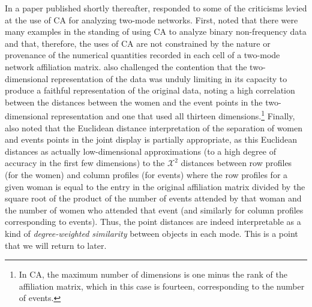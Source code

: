 \documentclass[a4paper,fleqn]{cas-sc}
\begin{document}
In a paper published shortly thereafter, \citet{roberts2000correspondence} responded to some of the criticisms \citet{borgatti1997network} levied at the use of CA for analyzing two-mode networks. First, \citet{roberts2000correspondence} noted that there were many examples in the standing of using CA to analyze binary non-frequency data and that, therefore, the uses of CA are not constrained by the nature or provenance of the numerical quantities recorded in each cell of a two-mode network affiliation matrix. \citet{roberts2000correspondence} also challenged the contention that the two-dimensional representation of the data was unduly limiting in its capacity to produce a faithful representation of the original data, noting a high correlation between the distances between the women and the event points in the two-dimensional representation and one that used all thirteen dimensions.\footnote{In CA, the maximum number of dimensions is one minus the rank of the affiliation matrix, which in this case is fourteen, corresponding to the number of events.} Finally, \citet{roberts2000correspondence} also noted that the Euclidean distance interpretation of the separation of women and events points in the joint display is partially appropriate, as this Euclidean distances as actually low-dimensional approximations (to a high degree of accuracy in the first few dimensions) to the $\mathcal{X}^2$ distances between row profiles (for the women) and column profiles (for events) where the row profiles for a given woman is equal to the entry in the original affiliation matrix divided by the square root of the product of the number of events attended by that woman and the number of women who attended that event (and similarly for column profiles corresponding to events). Thus, the point distances are indeed interpretable as a kind of \textit{degree-weighted similarity} between objects in each mode. This is a point that we will return to later.   
\end{document}
